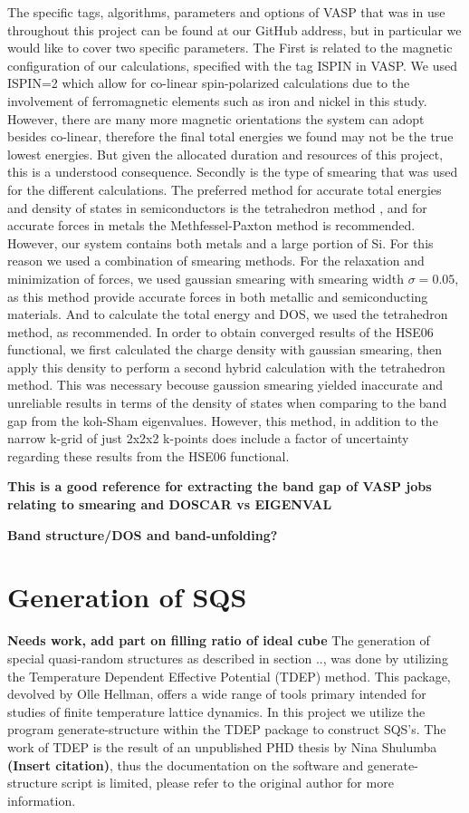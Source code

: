 The specific tags, algorithms, parameters and options of VASP that was in use throughout this project can be found at our GitHub address, but in particular we would like to cover two specific parameters. The First is related to the magnetic configuration of our calculations, specified with the tag ISPIN in VASP. We used ISPIN=2 which allow for co-linear spin-polarized calculations due to the involvement of ferromagnetic elements such as iron and nickel in this study. However, there are many more magnetic orientations the system can adopt besides co-linear, therefore the final total energies we found may not be the true lowest energies. But given the allocated duration and resources of this project, this is a understood consequence. Secondly is the type of smearing that was used for the different calculations. The preferred method for accurate total energies and density of states in semiconductors is the tetrahedron method \cite{ismear5}, and for accurate forces in metals the Methfessel-Paxton method is recommended. However, our system contains both metals and a large portion of Si. For this reason we used a combination of smearing methods. For the relaxation and minimization of forces, we used gaussian smearing with smearing width $\sigma = 0.05$, as this method provide accurate forces in both metallic and semiconducting materials. And to calculate the total energy and DOS, we used the tetrahedron method, as recommended. In order to obtain converged results of the HSE06 functional, we first calculated the charge density with gaussian smearing, then apply this density to perform a second hybrid calculation with the tetrahedron method. This was necessary becouse gaussion smearing yielded inaccurate and unreliable results in terms of the density of states when comparing to the band gap from the koh-Sham eigenvalues. However, this method, in addition to the narrow k-grid of just 2x2x2 k-points does include a factor of uncertainty regarding these results from the HSE06 functional. 


\textbf{This \cite{bandgap_vasp_forum} is a good reference for extracting the band gap of VASP jobs relating to smearing and DOSCAR vs EIGENVAL}

\textbf{Band structure/DOS and band-unfolding?}

\section{Generation of SQS}
\textbf{Needs work, add part on filling ratio of ideal cube}
The generation of special quasi-random structures as described in section .., was done by utilizing the Temperature Dependent Effective Potential (TDEP) method. This package, devolved by Olle Hellman, offers a wide range of tools primary intended for studies of finite temperature lattice dynamics. In this project we utilize the program generate-structure within the TDEP package to construct SQS's. The work of TDEP is the result of an unpublished PHD thesis by Nina Shulumba \textbf{(Insert citation)}, thus the documentation on the software and generate-structure script is limited, please refer to the original author for more information. 


